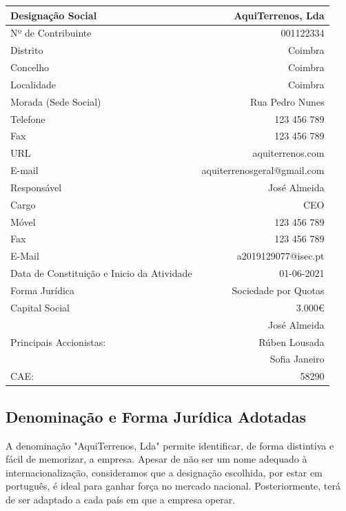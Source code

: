 \documentclass[11pt]{article}
\begin{document}
	\begin{center}
		\begin{tabular}{ | l | r | }
			\hline
			Designação Social & AquiTerrenos, Lda \\
			\hline
			Nº de Contribuinte & 001122334 \\
			\hline 
			Distrito & Coimbra \\
			\hline   
			Concelho & Coimbra \\
			\hline   
			Localidade & Coimbra \\
			\hline   
			Morada (Sede Social) & Rua Pedro Nunes \\
			\hline   
			Telefone & 123 456 789 \\
			\hline 
			Fax & 123 456 789 \\
			\hline 
			URL & aquiterrenos.com \\
			\hline
			E-mail & aquiterrenosgeral@gmail.com \\
			\hline 
			Responsável & José Almeida \\
			\hline 
			Cargo & CEO \\ 
			\hline
			Móvel & 123 456 789 \\
			\hline 
			Fax & 123 456 789 \\
			\hline 
			E-Mail & a2019129077@isec.pt \\
			\hline 
			Data de Constituição e Inicio da Atividade & 01-06-2021 \\
			\hline 
			Forma Jurídica & Sociedade por Quotas \\
			\hline 
			Capital Social & 3.000€ \\
			\hline
			\multirow{3}{*}{Principais Accionistas:} & José Almeida \\
			& Rúben Lousada  \\
			& Sofia Janeiro  \\
			\hline 
			CAE: & 58290 \\
			\hline 
		\end{tabular}
	\end{center}

	\large
	\subsection{Denominação e Forma Jurídica Adotadas}
	
	\normalsize
	
	A denominação "AquiTerrenos, Lda" permite identificar, de forma distintiva e fácil de memorizar, a empresa. Apesar de não ser um nome adequado à internacionalização, consideramos que a designação escolhida, por estar em português, é ideal para ganhar força no mercado nacional. Posteriormente, terá de ser adaptado a cada país em que a empresa operar.
	
\end{document}
